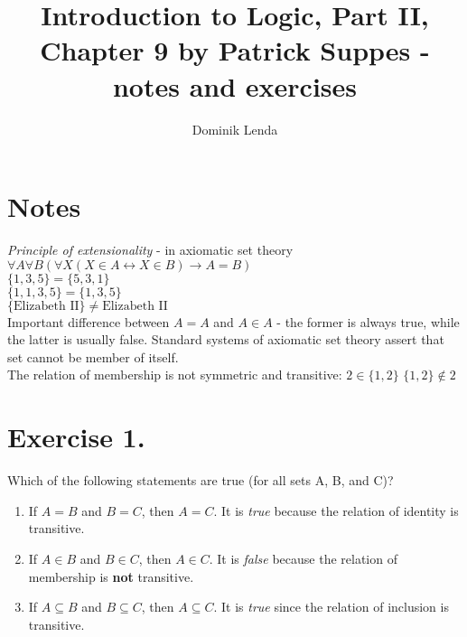 \documentclass{article}
\title{Introduction to Logic, Part II, Chapter 9 by Patrick Suppes - notes and exercises}
\author{Dominik Lenda}
\begin{document}
\maketitle

\section{Notes}
\emph{Principle of extensionality} - in axiomatic set theory\\
\smallskip
$\forall A \forall B (\forall X (X \in A \leftrightarrow X \in B) \rightarrow A = B)$\\
\smallskip
$\{1, 3, 5\} = \{5, 3, 1\}$\\
\smallskip
$\{1, 1, 3, 5\} = \{1, 3, 5\}$\\
\smallskip
$\{\text{Elizabeth II}\} \neq \text{Elizabeth II}$\\
Important difference between $A = A$ and $A \in A$ - the former is always true, while the latter is usually false. Standard systems of axiomatic set theory assert that set cannot be member of itself.\\
The relation of membership is not symmetric and transitive:
$2 \in \{1, 2\}$
$\{1, 2\} \notin 2$
\smallskip

\section*{Exercise 1.}
Which of the following statements are true (for all sets A, B, and C)?
\singlespace
\begin{enumerate}[label=(\alph*)]
\item If \(A = B\) and \(B = C\), then \(A = C\).
It is \emph{true} because the relation of identity is transitive.
\item If \(A \in B\) and \(B \in C\), then \(A \in C\).
It is \emph{false} because the relation of membership is \textbf{not} transitive.
\item If \(A \subseteq B\) and \(B \subseteq C\), then \(A \subseteq C\).
It is \emph{true} since the relation of inclusion is transitive.
\end{enumerate}
\end{document}
